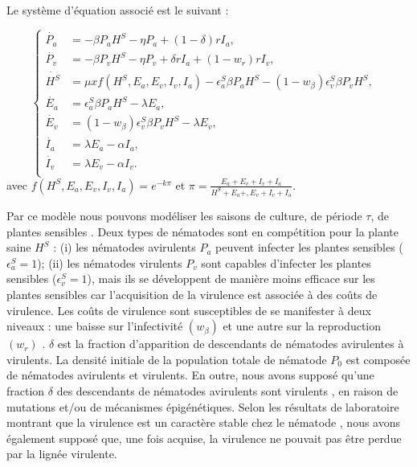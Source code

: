 	Le système d'équation associé est le suivant :
		
\begin{equation}
	\left\{
		\begin{aligned}
		\dot{P_a} & =- \beta P_aH^S -\eta P_a + (1-\delta)r I_a,&\\
		\dot{P_v} & =-\beta P_vH^S -\eta P_v + \delta r I_a +(1-w_{r})r I_v,&\\
		\dot{H^S} &= \mu x f(H^S,E_a,E_v,I_v,I_a)-\epsilon_a^S  
		\beta P_a H^S-(1-w_{\beta}) \epsilon_v^S \beta P_v H^S,& \\
		\dot{E_a} &= \epsilon_a^S \beta P_a H^S  - \lambda E_a, &\\
		\dot{E_v} &=  (1-w_{\beta}) \epsilon_v^S \beta P_v H^S  - \lambda E_v, &\\
		\dot{I_a} & = \lambda E_a - \alpha I_a ,&\\
		\dot{I_v} & = \lambda E_v - \alpha I_v .&\\
		\end{aligned}
	\right.
	\label{eq:mod-sensible}
\end{equation}
avec $f(H^S,E_a,E_v,I_v,I_a)= e^{-k \pi}$ et $ \pi= \frac{E_a+E_v+I_v+I_a}{H^S+E_a+,E_v+I_v+I_a}$. 	
	
	 Par ce modèle nous pouvons modéliser les saisons de culture, de période $\tau$, de plantes sensibles
. Deux types de nématodes sont en compétition pour la plante saine $H^S$ : (i) les nématodes avirulents
$P_a$ peuvent infecter les plantes sensibles ($\epsilon^S_a =1$); (ii) 
les nématodes virulents $P_v$  sont capables d'infecter 
les plantes sensibles ($\epsilon^S_v =1$), mais ils se développent de manière moins efficace 
sur les plantes sensibles car l'acquisition de la virulence est associée
à des coûts de virulence. Les coûts de virulence sont susceptibles de se manifester à deux niveaux :  une baisse sur l'infectivité $(w_\beta)$ 
et une autre sur la  reproduction $(w_r)$ \citep{Jarquin-Barberena1991, Castagnone-Sereno2007, Meher2009,
 Djian-Caporalino2011}. $\delta$ est la fraction
d’apparition de descendants de nématodes avirulentes à virulents.
La densité initiale de la population totale de nématode $P_0$ est composée de nématodes
avirulents et virulents. En outre, nous avons supposé qu'une fraction $\delta$ des
descendants de nématodes avirulents sont virulents \citep{Castagnone-Sereno1994},
en raison de mutations et/ou de mécanismes épigénétiques. Selon les résultats de laboratoire
montrant que la virulence est un caractère 
stable chez le nématode \citep{Castagnone-Sereno1993},
nous avons également supposé que, une fois acquise, la virulence
ne pouvait pas être perdue par la lignée virulente.
	 
